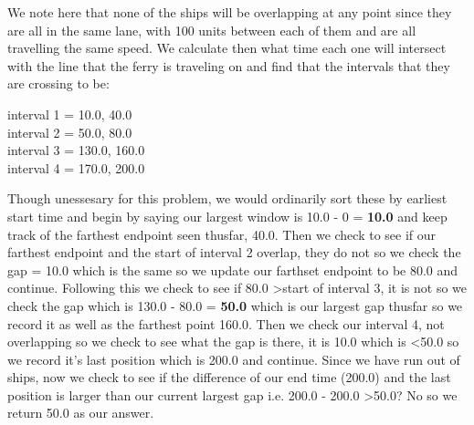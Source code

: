 \documentclass[12pt]{article}
\begin{document}
We note here that none of the ships will be overlapping at any point since they are all in the same
lane, with 100 units between each of them and are all travelling the same speed. We calculate then
what time each one will intersect with the line that the ferry is traveling on and find that the
intervals that they are crossing to be:
\begin{center}
interval 1 = 10.0, 40.0 \\
interval 2 = 50.0, 80.0 \\
interval 3 = 130.0, 160.0 \\
interval 4 = 170.0, 200.0
\end{center}
Though unessesary for this problem, we would ordinarily sort these by earliest start time and begin
by saying our largest window is 10.0 - 0 = \textbf{10.0} and keep track of the farthest endpoint seen thusfar,
40.0. Then we check to see if our farthest endpoint and the start of interval 2 overlap, they do not
so we check the gap = 10.0 which is the same so we update our farthset endpoint to be 80.0 and continue.
Following this we check to see if 80.0 \textgreater start of interval 3, it is not so we check the gap
which is 130.0 - 80.0 = \textbf{50.0} which is our largest gap thusfar so we record it as well as the farthest
point 160.0. Then we check our interval 4, not overlapping so we check to see what the gap is there,
it is 10.0 which is \textless 50.0 so we record it's last position which is 200.0 and continue.  Since
we have run out of ships, now we check to see if the difference of our end time (200.0) and the last position
is larger than our current largest gap i.e. 200.0 - 200.0 \textgreater 50.0? No so we return 50.0 as our answer.

\end{document}

